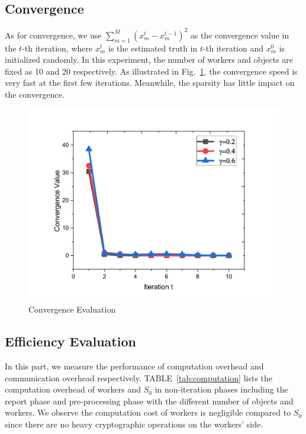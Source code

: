 \documentclass[conference]{IEEEtran}
\begin{document}
\subsection{Convergence}
As for convergence, we use $\sum_{m=1}^M (x_m^t - x_m^{t-1})^2$ as the convergence value in the $t$-th iteration, where $x_m^t$ is the estimated truth in $t$-th iteration and $x_m^0$ is initialized randomly.
In this experiment, the number of workers and objects are fixed as 10 and 20 respectively.
As illustrated in Fig.~\ref{fig:conver}, the convergence speed is very fast at the first few iterations.
Meanwhile, the sparsity has little impact on the convergence.
\begin{figure}[htbp]
  \centering
  \includegraphics[width=0.65\linewidth]{figures/conver.pdf}
  \caption{Convergence Evaluation}
  \label{fig:conver}
\end{figure}

\subsection{Efficiency Evaluation}
In this part, we measure the performance of computation overhead and communication overhead respectively.
TABLE~\ref{tab:computation} lists the computation overhead of workers and $S_0$ in non-iteration phases including the report phase and pre-processing phase with the different number of objects and workers.
We observe the computation cost of workers is negligible compared to $S_0$ since there are no heavy cryptographic operations on the workers' side.
\end{document}
